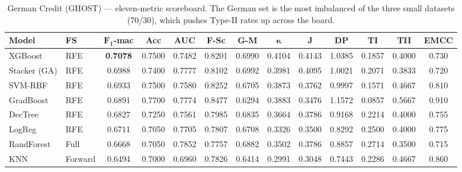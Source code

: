\begin{table}[H]
\centering
\caption{German Credit (GHOST) --- eleven-metric scoreboard. The
German set is the most imbalanced of the three small datasets
(70/30), which pushes Type-II rates up across the board.}
\singlespacing
\label{tab:11m-ger}
\scriptsize
\setlength{\tabcolsep}{3.5pt}
\renewcommand{\arraystretch}{1.15}
\begin{tabular}{l l c c c c c c c c c c c}
\toprule
\textbf{Model} & \textbf{FS} & $\boldsymbol{F_1}$\textbf{-mac} & \textbf{Acc} & \textbf{AUC} & \textbf{F-Sc} & \textbf{G-M} & $\boldsymbol{\kappa}$ & \textbf{J} & \textbf{DP} & \textbf{TI} & \textbf{TII} & \textbf{EMCC}\\
\midrule
XGBoost      & RFE     & \textbf{0.7078} & 0.7500 & 0.7482 & 0.8201 & 0.6990 & 0.4104 & 0.4143 & 1.0385 & 0.1857 & 0.4000 & 0.730\\
Stacker (GA) & RFE     & 0.6988 & 0.7400 & 0.7777 & 0.8102 & 0.6992 & 0.3981 & 0.4095 & 1.0021 & 0.2071 & 0.3833 & 0.720\\
SVM-RBF      & RFE     & 0.6933 & 0.7500 & 0.7580 & 0.8252 & 0.6705 & 0.3873 & 0.3762 & 0.9997 & 0.1571 & 0.4667 & 0.810\\
GradBoost    & RFE     & 0.6891 & 0.7700 & 0.7774 & 0.8477 & 0.6294 & 0.3883 & 0.3476 & 1.1572 & 0.0857 & 0.5667 & 0.910\\
DecTree      & RFE     & 0.6827 & 0.7250 & 0.7561 & 0.7985 & 0.6835 & 0.3664 & 0.3786 & 0.9168 & 0.2214 & 0.4000 & 0.755\\
LogReg       & RFE     & 0.6711 & 0.7050 & 0.7705 & 0.7807 & 0.6708 & 0.3326 & 0.3500 & 0.8292 & 0.2500 & 0.4000 & 0.775\\
RandForest   & Full    & 0.6668 & 0.7050 & 0.7852 & 0.7757 & 0.6882 & 0.3502 & 0.3786 & 0.8857 & 0.2714 & 0.3500 & 0.715\\
KNN          & Forward & 0.6494 & 0.7000 & 0.6960 & 0.7826 & 0.6414 & 0.2991 & 0.3048 & 0.7443 & 0.2286 & 0.4667 & 0.860\\
\bottomrule
\end{tabular}
\end{table}

